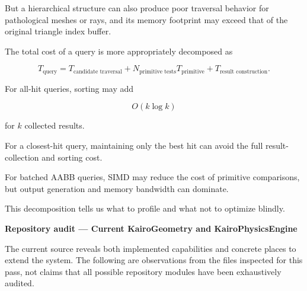 But a hierarchical structure can also produce poor traversal behavior for pathological meshes or rays, and its memory footprint may exceed that of the original triangle index buffer.

The total cost of a query is more appropriately decomposed as

\[
T_{\text{query}} = T_{\text{candidate traversal}} + N_{\text{primitive tests}}T_{\text{primitive}} + T_{\text{result construction}}.
\]

For all-hit queries, sorting may add

\[
O(k\log k)
\]

for \(k\) collected results.

For a closest-hit query, maintaining only the best hit can avoid the full result-collection and sorting cost.

For batched AABB queries, SIMD may reduce the cost of primitive comparisons, but output generation and memory bandwidth can dominate.

This decomposition tells us what to profile and what not to optimize blindly.

\textbf{Repository audit --- Current KairoGeometry and KairoPhysicsEngine}

The current source reveals both implemented capabilities and concrete places to extend the system. The following are observations from the files inspected for this pass, not claims that all possible repository modules have been exhaustively audited.

